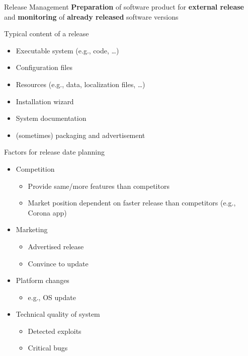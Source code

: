 \begin{frame}{\insertsubsection{}  \mytitlesource{\sommerville}}
	\begin{fancycolumns}[animation=none]
		\begin{definition}{Release Management}
			\textbf{Preparation} of software product for \textbf{external release} and  \textbf{monitoring} of \textbf{already released} software versions
		\end{definition}\pause

		\begin{note}{Typical content of a release}
			\begin{itemize}
				\item Executable system (e.g., code, \dots)
				\item Configuration files
				\item Resources (e.g., data, localization files, \dots)
				\item Installation wizard
				\item System documentation
				\item (sometimes) packaging and advertisement
			\end{itemize}
		\end{note}\pause
		\nextcolumn
		\vspace{-7mm}
		\begin{note}{Factors for release date planning}
			\begin{itemize}
				\item Competition
				      \begin{itemize}
					      \item Provide same/more features than competitors
					      \item Market position dependent on faster release than competitors (e.g., Corona app)
				      \end{itemize}
				\item Marketing
				      \begin{itemize}
					      \item Advertised release
					      \item Convince to update
				      \end{itemize}
				\item Platform changes
				      \begin{itemize}
					      \item e.g., OS update
				      \end{itemize}
				\item Technical quality of system
				      \begin{itemize}
					      \item Detected exploits
					      \item Critical bugs
				      \end{itemize}
			\end{itemize}
		\end{note}
	\end{fancycolumns}
\end{frame}


